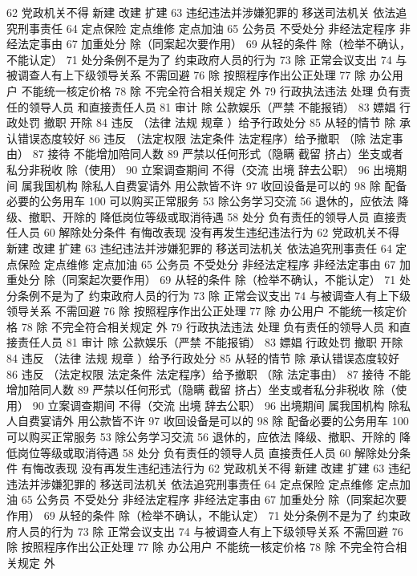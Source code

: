 \documentclass[cyan]{elegantnote}
\begin{document}
62 党政机关不得
新建 改建 扩建
63 违纪违法并涉嫌犯罪的
移送司法机关
依法追究刑事责任
64 定点保险 定点维修 定点加油
65 公务员 不受处分
非经法定程序
非经法定事由
67 加重处分
除（同案起次要作用）
69 从轻的条件
除（检举不确认，不能认定）
71 处分条例不是为了
约束政府人员的行为
73 除 正常会议支出
74 与被调查人有上下级领导关系 不需回避
76 除 按照程序作出公正处理
77 除 办公用户
不能统一核定价格
78 除 不完全符合相关规定 外
79 行政执法违法 处理
负有责任的领导人员
和直接责任人员
81 审计
除 公款娱乐（严禁 不能报销）
83 嫖娼 行政处罚
撤职 开除
84 违反 （法律 法规 规章 ）给予行政处分
85 从轻的情节
除 承认错误态度较好
86 违反 （法定权限 法定条件 法定程序）给予撤职
（除 法定事由）
87 接待 不能增加陪同人数
89 严禁以任何形式（隐瞒 截留 挤占）坐支或者私分非税收
除（使用）
90 立案调查期间 不得（交流 出境 辞去公职）
96 出境期间 属我国机构 除私人自费宴请外 用公款皆不许
97 收回设备是可以的
98 除 配备必要的公务用车
100 可以购买正常服务
53 除公务学习交流
56 退休的，应依法
降级、撤职、开除的 降低岗位等级或取消待遇
58 处分
负有责任的领导人员
直接责任人员
60 解除处分条件
有悔改表现
没有再发生违纪违法行为
62 党政机关不得
新建 改建 扩建
63 违纪违法并涉嫌犯罪的
移送司法机关
依法追究刑事责任
64 定点保险 定点维修 定点加油
65 公务员 不受处分
非经法定程序
非经法定事由
67 加重处分
除（同案起次要作用）
69 从轻的条件
除（检举不确认，不能认定）
71 处分条例不是为了
约束政府人员的行为
73 除 正常会议支出
74 与被调查人有上下级领导关系 不需回避
76 除 按照程序作出公正处理
77 除 办公用户
不能统一核定价格
78 除 不完全符合相关规定 外
79 行政执法违法 处理
负有责任的领导人员
和直接责任人员
81 审计
除 公款娱乐（严禁 不能报销）
83 嫖娼 行政处罚
撤职 开除
84 违反 （法律 法规 规章 ）给予行政处分
85 从轻的情节
除 承认错误态度较好
86 违反 （法定权限 法定条件 法定程序）给予撤职
（除 法定事由）
87 接待 不能增加陪同人数
89 严禁以任何形式（隐瞒 截留 挤占）坐支或者私分非税收
除（使用）
90 立案调查期间 不得（交流 出境 辞去公职）
96 出境期间 属我国机构 除私人自费宴请外 用公款皆不许
97 收回设备是可以的
98 除 配备必要的公务用车
100 可以购买正常服务
53 除公务学习交流
56 退休的，应依法
降级、撤职、开除的 降低岗位等级或取消待遇
58 处分
负有责任的领导人员
直接责任人员
60 解除处分条件
有悔改表现
没有再发生违纪违法行为
62 党政机关不得
新建 改建 扩建
63 违纪违法并涉嫌犯罪的
移送司法机关
依法追究刑事责任
64 定点保险 定点维修 定点加油
65 公务员 不受处分
非经法定程序
非经法定事由
67 加重处分
除（同案起次要作用）
69 从轻的条件
除（检举不确认，不能认定）
71 处分条例不是为了
约束政府人员的行为
73 除 正常会议支出
74 与被调查人有上下级领导关系 不需回避
76 除 按照程序作出公正处理
77 除 办公用户
不能统一核定价格
78 除 不完全符合相关规定 外
\end{document}

